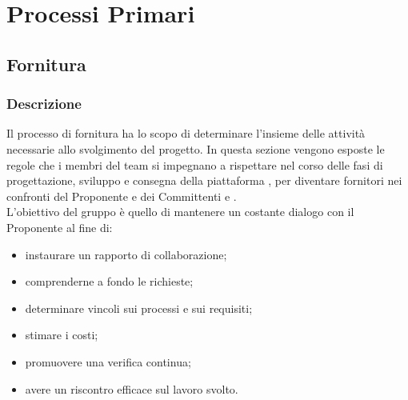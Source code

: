 \section{Processi Primari}
    \subsection{Fornitura}
        \subsubsection{Descrizione}
        Il processo di fornitura ha lo scopo di determinare l'insieme delle attività necessarie allo svolgimento del progetto. %
         In questa sezione vengono esposte le regole che i membri del team \Gruppo{} si impegnano a rispettare nel corso delle fasi di progettazione, sviluppo e consegna della piattaforma \NomeProgetto{}, per diventare fornitori nei confronti del Proponente \Proponente{} e dei Committenti \TV{} e \RC{}. \\
         L'obiettivo del gruppo è quello di mantenere un costante dialogo con il Proponente al fine di:
         \begin{itemize}
		\item{instaurare un rapporto di collaborazione;} 
		\item{comprenderne a fondo le richieste;}
		\item{determinare vincoli sui processi e sui requisiti;}
		\item{stimare i costi;}
		\item{promuovere una verifica continua;}
		\item{avere un riscontro efficace sul lavoro svolto.}
         \end{itemize}
        
